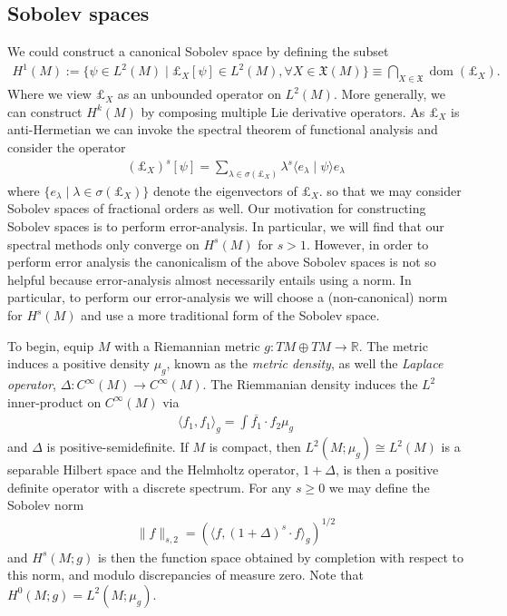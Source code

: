 \documentclass[12pt]{amsart}
\begin{document}
\subsection{Sobolev spaces}
\label{sec:Sobolev spaces}
We could construct a canonical Sobolev space by defining the subset
\begin{align*}
	H^{1}(M) := \{ \psi \in L^{2}(M) \mid \pounds_{X}[\psi] \in L^{2}(M) , \forall X \in \mathfrak{X}(M) \} \equiv \bigcap_{X \in \mathfrak{X}} \operatorname{dom}( \pounds_{X} ).
\end{align*}
Where we view $\pounds_{X}$ as an unbounded operator on $L^{2}(M)$.
More generally, we can construct $H^{k}(M)$ by composing multiple Lie derivative operators.
As $\pounds_{X}$ is anti-Hermetian we can invoke the spectral theorem of functional analysis
and consider the operator
\begin{align*}
	(\pounds_{X})^{s} [ \psi] = \sum_{\lambda \in \sigma( \pounds_{X}) } \lambda^{s} \langle e_{\lambda} \mid \psi \rangle e_{\lambda}
\end{align*}
where $\{ e_{\lambda} \mid \lambda \in \sigma( \pounds_{X}) \}$ denote the eigenvectors of $\pounds_{X}$. 
so that we may consider Sobolev spaces of fractional orders as well.
Our motivation for constructing Sobolev spaces is to perform error-analysis.
In particular, we will find that our spectral methods only converge on $H^{s}(M)$ for $s>1$.
However, in order to perform error analysis the canonicalism of the above Sobolev spaces is not so helpful
because error-analysis almost necessarily entails using a norm.
In particular, to perform our error-analysis we will choose a (non-canonical) norm for $H^{s}(M)$
and use a more traditional form of the Sobolev space.

To begin, equip $M$ with a Riemannian metric $g:TM \oplus TM \to \mathbb{R}$.
The metric induces a positive density $\mu_g$,
known as the \emph{metric density},
as well the \emph{Laplace operator},
$\Delta:C^\infty(M) \to C^{\infty}(M)$. 
The Riemmanian density induces the $L^2$ inner-product on $C^\infty(M)$ via
\begin{align*}
	\langle f_1 , f_1 \rangle_{g} = \int \overline{f_1} \cdot f_2 \mu_g
\end{align*}
and $\Delta$ is positive-semidefinite.
If $M$ is compact, then $L^2(M ; \mu_g) \cong L^2(M)$ is a separable Hilbert space
and the Helmholtz operator, $1 + \Delta$, is then a positive definite operator
with a discrete spectrum.
For any $s \geq 0$ we may define the Sobolev norm
\begin{align*}
	\| f \|_{s,2} =  \left( \langle f , (1+\Delta)^s \cdot f \rangle_{g} \right)^{1/2}
\end{align*}
and $H^s(M ; g)$ is then the function space obtained by completion with respect to this norm, and modulo discrepancies of measure zero.
Note that $H^0(M;g) = L^2(M;\mu_g)$.
\end{document}
